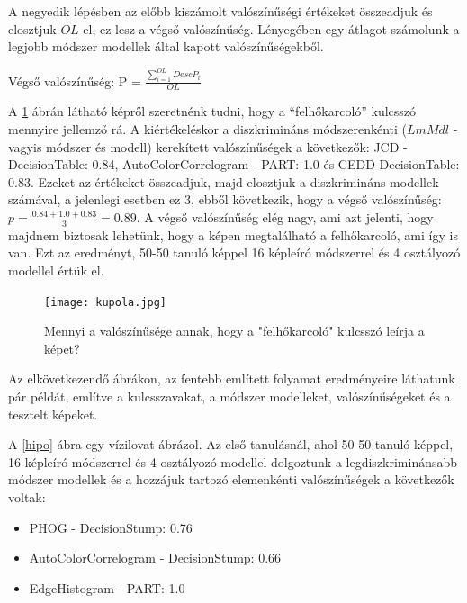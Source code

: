 \documentclass[12pt, a4paper, oneside]{book}
\theoremstyle{tetel}
\begin{document}
	A negyedik lépésben az előbb kiszámolt valószínűségi értékeket összeadjuk és elosztjuk $OL$-el, ez lesz a végső valószínűség. Lényegében egy átlagot számolunk a legjobb módszer modellek által kapott valószínűségekből.

\vspace{0.5cm}

	Végső valószínűség: P = $\frac{\sum_{i=1}^{OL} DescP_i}{OL}$

\vspace{0.5cm}

	A \ref{kupola} ábrán látható képről szeretnénk tudni, hogy a “felhőkarcoló” kulcsszó mennyire jellemző rá. A kiértékeléskor a diszkrimináns módszerenkénti ($LmMdl$ - vagyis módszer és modell) kerekített valószínűségek a következők: JCD - DecisionTable: 0.84, AutoColorCorrelogram - PART: 1.0 és CEDD-DecisionTable: 0.83. Ezeket az értékeket összeadjuk, majd elosztjuk a diszkrimináns modellek számával, a jelenlegi esetben ez 3, ebből következik, hogy a végső valószínűség: $p=\frac{0.84+1.0+0.83}{3}=0.89$. A végső valószínűség elég nagy, ami azt jelenti, hogy majdnem biztosak lehetünk, hogy a képen megtalálható a felhőkarcoló, ami így is van. Ezt az eredményt, 50-50 tanuló képpel 16 képleíró módszerrel és 4 osztályozó modellel értük el.

\vspace{0.5cm}

\begin{figure}[h]
\begin{center}
\texttt{[image: kupola.jpg]}
\caption{{ Mennyi a valószínűsége annak, hogy a "felhőkarcoló" kulcsszó leírja a képet?}}
\label{kupola}
\end{center}
\end{figure}

	Az elkövetkezendő ábrákon, az fentebb említett folyamat eredményeire láthatunk pár példát, említve a kulcsszavakat, a módszer modelleket, valószínűségeket és a tesztelt képeket.

	A \ref{hipo} ábra egy vízilovat ábrázol. Az első tanulásnál, ahol 50-50 tanuló képpel, 16 képleíró módszerrel és 4 osztályozó modellel dolgoztunk a legdiszkriminánsabb módszer modellek és a hozzájuk tartozó elemenkénti valószínűségek a következők voltak:

\begin{itemize}
  \item PHOG - DecisionStump: 0.76
  \item AutoColorCorrelogram - DecisionStump: 0.66
  \item EdgeHistogram - PART: 1.0
\end{itemize}
\end{document}
